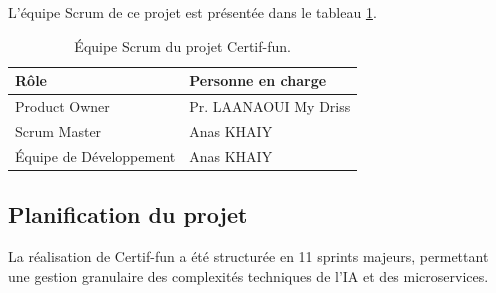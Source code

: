 L’équipe Scrum de ce projet est présentée dans le tableau \ref{table:equipe_scrum}.

\begin{table}[H]
\centering
\caption{Équipe Scrum du projet Certif-fun.}
\label{table:equipe_scrum}
\begin{tabular}{|l|l|}
\hline
\textbf{Rôle} & \textbf{Personne en charge} \\ \hline
Product Owner & Pr. LAANAOUI My Driss \\ \hline
Scrum Master & Anas KHAIY \\ \hline
Équipe de Développement & Anas KHAIY \\ \hline
\end{tabular}
\end{table}

\subsection{Planification du projet}
La réalisation de Certif-fun a été structurée en 11 sprints majeurs, permettant une gestion granulaire des complexités techniques de l'IA et des microservices.

